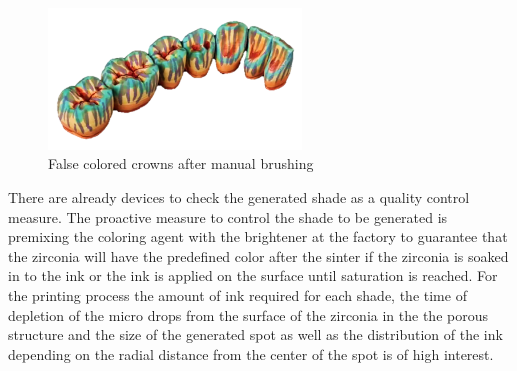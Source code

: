 \bigskip

\begin{figure}[H]
	\centering
	\includegraphics[width=0.6\textwidth]{grafiken/false_colored.png}
	\caption{False colored crowns after manual brushing \citep{zirkonzahn2018}}
	\label{fig:false_colored}
\end{figure}

\bigskip

There are already devices to check the generated shade as a quality control measure. The proactive measure to control the shade to be generated is premixing the coloring agent with the brightener at the factory to guarantee that the zirconia will have the predefined color after the sinter if the zirconia is soaked in to the ink or the ink is applied on the surface until saturation is reached.
For the printing process the amount of ink required for each shade, the time of depletion of the micro drops from the surface of the zirconia in the the porous structure and the size of the generated spot as well as the distribution of the ink depending on the radial distance from the center of the spot is of high interest.